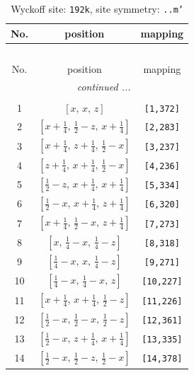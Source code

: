 \documentclass[fleqn,8pt]{jsarticle}
\begin{document}
\begin{longtable}{ccc}
\caption{Wyckoff site: {\tt 192k}, site symmetry: {\tt ..m'}}
 \\
 \hline \hline
No. & position & mapping \\ \hline \endfirsthead

\multicolumn{2}{l}{\tablename\ \thetable{}} \\
 \hline \hline
No. & position & mapping \\ \hline \endhead

 \hline \hline
\multicolumn{2}{r}{\footnotesize\it continued ...} \\ \endfoot

 \hline \hline
\multicolumn{2}{r}{} \\ \endlastfoot

1 & $\left[ x,\, x,\, z \right]$ & {\tt [1,372]} \\ \hline
2 & $\left[ x + \frac{1}{4},\, \frac{1}{2} - z,\, x + \frac{1}{4} \right]$ & {\tt [2,283]} \\ \hline
3 & $\left[ x + \frac{1}{4},\, z + \frac{1}{4},\, \frac{1}{2} - x \right]$ & {\tt [3,237]} \\ \hline
4 & $\left[ z + \frac{1}{4},\, x + \frac{1}{4},\, \frac{1}{2} - x \right]$ & {\tt [4,236]} \\ \hline
5 & $\left[ \frac{1}{2} - z,\, x + \frac{1}{4},\, x + \frac{1}{4} \right]$ & {\tt [5,334]} \\ \hline
6 & $\left[ \frac{1}{2} - x,\, x + \frac{1}{4},\, z + \frac{1}{4} \right]$ & {\tt [6,320]} \\ \hline
7 & $\left[ x + \frac{1}{4},\, \frac{1}{2} - x,\, z + \frac{1}{4} \right]$ & {\tt [7,273]} \\ \hline
8 & $\left[ x,\, \frac{1}{4} - x,\, \frac{1}{4} - z \right]$ & {\tt [8,318]} \\ \hline
9 & $\left[ \frac{1}{4} - x,\, x,\, \frac{1}{4} - z \right]$ & {\tt [9,271]} \\ \hline
10 & $\left[ \frac{1}{4} - x,\, \frac{1}{4} - x,\, z \right]$ & {\tt [10,227]} \\ \hline
11 & $\left[ x + \frac{1}{4},\, x + \frac{1}{4},\, \frac{1}{2} - z \right]$ & {\tt [11,226]} \\ \hline
12 & $\left[ \frac{1}{2} - x,\, \frac{1}{2} - x,\, \frac{1}{2} - z \right]$ & {\tt [12,361]} \\ \hline
13 & $\left[ \frac{1}{2} - x,\, z + \frac{1}{4},\, x + \frac{1}{4} \right]$ & {\tt [13,335]} \\ \hline
14 & $\left[ \frac{1}{2} - x,\, \frac{1}{2} - z,\, \frac{1}{2} - x \right]$ & {\tt [14,378]} \\ \hline

\end{longtable}
\end{document}
